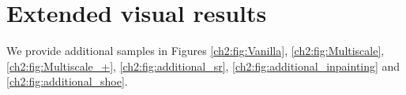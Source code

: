 \section{Extended visual results}\label{ch2:Extended visual_results}

We provide additional samples in Figures \ref{ch2:fig:Vanilla}, \ref{ch2:fig:Multiscale}, \ref{ch2:fig:Multiscale_+}, \ref{ch2:fig:additional_sr}, \ref{ch2:fig:additional_inpainting} and \ref{ch2:fig:additional_shoe}.



